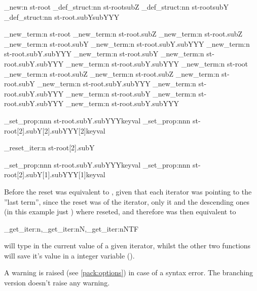 \documentclass[10pt]{article}
\begin{document}
\begin{codestore}[store-env=demo7]
\starray_new:n {st-root}
\starray_def_struct:nn {st-root}{subZ}
\starray_def_struct:nn {st-root}{subY}
\starray_def_struct:nn {st-root.subY}{subYYY}

\starray_new_term:n {st-root}
\starray_new_term:n {st-root.subZ}
\starray_new_term:n {st-root.subZ}
\starray_new_term:n {st-root.subY}
\starray_new_term:n {st-root.subY.subYYY}
\starray_new_term:n {st-root.subY.subYYY}
\starray_new_term:n {st-root.subY}
\starray_new_term:n {st-root.subY.subYYY}
\starray_new_term:n {st-root.subY.subYYY}
\starray_new_term:n {st-root}
\starray_new_term:n {st-root.subZ}
\starray_new_term:n {st-root.subZ}
\starray_new_term:n {st-root.subY}
\starray_new_term:n {st-root.subY.subYYY}
\starray_new_term:n {st-root.subY.subYYY}
\starray_new_term:n {st-root.subY}
\starray_new_term:n {st-root.subY.subYYY}
\starray_new_term:n {st-root.subY.subYYY}

\starray_set_prop:nnn {st-root.subY.subYYY}{key}{val}
\starray_set_prop:nnn {st-root[2].subY[2].subYYY[2]}{key}{val}

\starray_reset_iter:n {st-root[2].subY}

\starray_set_prop:nnn {st-root.subY.subYYY}{key}{val}
\starray_set_prop:nnn {st-root[2].subY[1].subYYY[1]}{key}{val}
\end{codestore}


Before the reset  was equivalent to , given that each iterator was pointing to the ''last term'', since the reset was of the  iterator, only it and the descending ones (in this example just ) where reseted, and therefore  was then equivalent to 



\begin{codedescribe}{\starray_get_iter:n,\starray_get_iter:nN,\starray_get_iter:nNTF}
\begin{codesyntax}%
\end{codesyntax}
\end{codedescribe}
 will type in the current value of a given iterator, whilst the other two functions will save it's value in a integer variable ().
\begin{tsremark}
A warning is raised (see \ref{pack:options}) in case of a  syntax error. The branching version doesn't raise any warning.
\end{tsremark}
\end{document}

